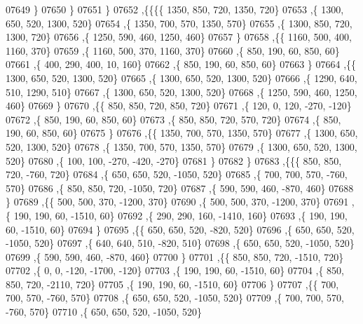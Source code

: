 \begin{DoxyCode}
07649     \}
07650    \}
07651   \}
07652  ,\{\{\{\{  1350,   850,   720,  1350,   720\}
07653     ,\{  1300,   650,   520,  1300,   520\}
07654     ,\{  1350,   700,   570,  1350,   570\}
07655     ,\{  1300,   850,   720,  1300,   720\}
07656     ,\{  1250,   590,   460,  1250,   460\}
07657     \}
07658    ,\{\{  1160,   500,   400,  1160,   370\}
07659     ,\{  1160,   500,   370,  1160,   370\}
07660     ,\{   850,   190,    60,   850,    60\}
07661     ,\{   400,   290,   400,    10,   160\}
07662     ,\{   850,   190,    60,   850,    60\}
07663     \}
07664    ,\{\{  1300,   650,   520,  1300,   520\}
07665     ,\{  1300,   650,   520,  1300,   520\}
07666     ,\{  1290,   640,   510,  1290,   510\}
07667     ,\{  1300,   650,   520,  1300,   520\}
07668     ,\{  1250,   590,   460,  1250,   460\}
07669     \}
07670    ,\{\{   850,   850,   720,   850,   720\}
07671     ,\{   120,     0,   120,  -270,  -120\}
07672     ,\{   850,   190,    60,   850,    60\}
07673     ,\{   850,   850,   720,   570,   720\}
07674     ,\{   850,   190,    60,   850,    60\}
07675     \}
07676    ,\{\{  1350,   700,   570,  1350,   570\}
07677     ,\{  1300,   650,   520,  1300,   520\}
07678     ,\{  1350,   700,   570,  1350,   570\}
07679     ,\{  1300,   650,   520,  1300,   520\}
07680     ,\{   100,   100,  -270,  -420,  -270\}
07681     \}
07682    \}
07683   ,\{\{\{   850,   850,   720,  -760,   720\}
07684     ,\{   650,   650,   520, -1050,   520\}
07685     ,\{   700,   700,   570,  -760,   570\}
07686     ,\{   850,   850,   720, -1050,   720\}
07687     ,\{   590,   590,   460,  -870,   460\}
07688     \}
07689    ,\{\{   500,   500,   370, -1200,   370\}
07690     ,\{   500,   500,   370, -1200,   370\}
07691     ,\{   190,   190,    60, -1510,    60\}
07692     ,\{   290,   290,   160, -1410,   160\}
07693     ,\{   190,   190,    60, -1510,    60\}
07694     \}
07695    ,\{\{   650,   650,   520,  -820,   520\}
07696     ,\{   650,   650,   520, -1050,   520\}
07697     ,\{   640,   640,   510,  -820,   510\}
07698     ,\{   650,   650,   520, -1050,   520\}
07699     ,\{   590,   590,   460,  -870,   460\}
07700     \}
07701    ,\{\{   850,   850,   720, -1510,   720\}
07702     ,\{     0,     0,  -120, -1700,  -120\}
07703     ,\{   190,   190,    60, -1510,    60\}
07704     ,\{   850,   850,   720, -2110,   720\}
07705     ,\{   190,   190,    60, -1510,    60\}
07706     \}
07707    ,\{\{   700,   700,   570,  -760,   570\}
07708     ,\{   650,   650,   520, -1050,   520\}
07709     ,\{   700,   700,   570,  -760,   570\}
07710     ,\{   650,   650,   520, -1050,   520\}

\end{DoxyCode}
